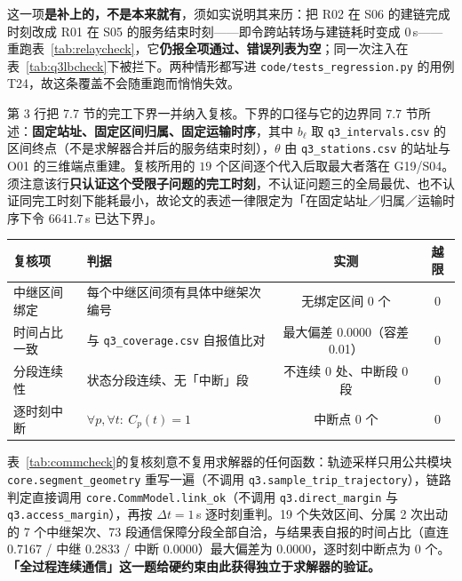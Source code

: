这一项\textbf{是补上的，不是本来就有}，须如实说明其来历：把 R02 在 S06 的建链完成时刻改成 R01 在 S05 的服务结束时刻——即令跨站转场与建链耗时变成 $0$\,s——重跑表~\ref{tab:relaycheck}，它\textbf{仍报全项通过、错误列表为空}；同一次注入在表~\ref{tab:q3lbcheck}下被拦下。两种情形都写进 \texttt{code/\allowbreak tests\_\allowbreak regression.py} 的用例 T24，故这条覆盖不会随重跑而悄悄失效。

第 3 行把 7.7 节的完工下界一并纳入复核。下界的口径与它的边界同 7.7 节所述：\textbf{固定站址、固定区间归属、固定运输时序}，其中 $b_\ell$ 取 \texttt{q3\_intervals.csv} 的区间终点（不是求解器合并后的服务结束时刻），$\theta$ 由 \texttt{q3\_stations.csv} 的站址与 O01 的三维端点重建。复核所用的 $19$ 个区间逐个代入后取最大者落在 G19/S04。须注意该行\textbf{只认证这个受限子问题的完工时刻}，不认证问题三的全局最优、也不认证同完工时刻下能耗最小，故论文的表述一律限定为「在固定站址／归属／运输时序下令 $6641.7$\,s 已达下界」。

\begin{center}
\begin{minipage}{\textwidth}
	\label{tab:commcheck}
	\centering
	\begin{tabularx}{0.98\textwidth}{lXcc}
		\toprule
		复核项 & 判据 & 实测 & 越限 \\
		\midrule
		中继区间绑定 & 每个中继区间须有具体中继架次编号 & 无绑定区间 0 个 & 0 \\
		时间占比一致 & 与 \texttt{q3\_coverage.csv} 自报值比对 & 最大偏差 0.0000（容差 0.01） & 0 \\
		分段连续性 & 状态分段连续、无「中断」段 & 不连续 0 处、中断段 0 段 & 0 \\
		逐时刻中断 & $\forall p,\forall t:\ C_p(t)=1$ & 中断点 0 个 & 0 \\
		\bottomrule
	\end{tabularx}
\end{minipage}
\end{center}

表~\ref{tab:commcheck}的复核刻意不复用求解器的任何函数：轨迹采样只用公共模块 \texttt{core.\allowbreak segment\_\allowbreak geometry} 重写一遍（不调用 \texttt{q3.\allowbreak sample\_\allowbreak trip\_\allowbreak trajectory}），链路判定直接调用 \texttt{core.\allowbreak CommModel.\allowbreak link\_ok}（不调用 \texttt{q3.direct\_margin} 与 \texttt{q3.access\_margin}），再按 $\Delta t=1$\,s 逐时刻重判。19 个失效区间、分属 2 次出动的 7 个中继架次、73 段通信保障分段全部自洽，与结果表自报的时间占比（直连 0.7167 / 中继 0.2833 / 中断 0.0000）最大偏差为 0.0000，逐时刻中断点为 0 个。\textbf{「全过程连续通信」这一题给硬约束由此获得独立于求解器的验证。}

